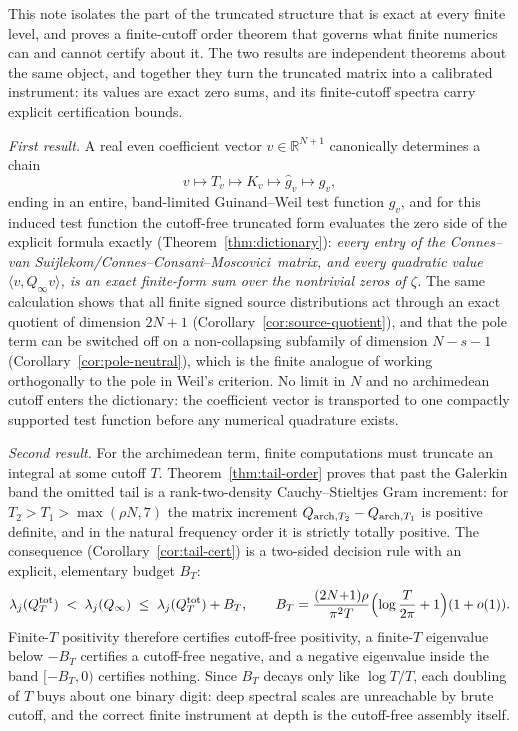 \documentclass[11pt]{article}
\theoremstyle{plain}
\theoremstyle{definition}
\theoremstyle{remark}
\newcommand{\R}{\mathbb R}
\newcommand{\cvs}{Connes--van Suijlekom}
\newcommand{\ccm}{Connes--Consani--Moscovici}
\newcommand{\wh}{\widehat}
\newcommand{\Qinf}{Q_{\infty}}
\begin{document}
This note isolates the part of the truncated structure that is exact at every
finite level, and proves a finite-cutoff order theorem that governs what
finite numerics can and cannot certify about it.  The two results are
independent theorems about the same object, and together they turn the
truncated matrix into a calibrated instrument: its values are exact zero
sums, and its finite-cutoff spectra carry explicit certification bounds.

\emph{First result.}  A real even coefficient vector $v\in\R^{N+1}$
canonically determines a chain
\[
        v\longmapsto T_v\longmapsto K_v\longmapsto \wh g_v\longmapsto g_v,
\]
ending in an entire, band-limited Guinand--Weil test function $g_v$, and for
this induced test function the cutoff-free truncated form evaluates the zero
side of the explicit formula exactly (Theorem~\ref{thm:dictionary}):
\emph{every entry of the \cvs/\ccm\ matrix, and every quadratic value
$\langle v,\Qinf v\rangle$, is an exact finite-form sum over the nontrivial
zeros of $\zeta$.}  The same calculation shows that all finite signed source
distributions act through an exact quotient of dimension $2N+1$
(Corollary~\ref{cor:source-quotient}), and that the pole term can be switched
off on a non-collapsing subfamily of dimension $N-s-1$
(Corollary~\ref{cor:pole-neutral}), which is the finite analogue of working
orthogonally to the pole in Weil's criterion.  No limit in $N$ and no
archimedean cutoff enters the dictionary: the coefficient vector is
transported to one compactly supported test function before any numerical
quadrature exists.

\emph{Second result.}  For the archimedean term, finite computations must
truncate an integral at some cutoff $T$.  Theorem~\ref{thm:tail-order} proves
that past the Galerkin band the omitted tail is a rank-two-density
Cauchy--Stieltjes Gram increment: for $T_2>T_1>\max(\rho N,7)$ the matrix
increment $Q_{{\rm arch},T_2}-Q_{{\rm arch},T_1}$ is positive definite, and in
the natural frequency order it is strictly totally positive.  The consequence
(Corollary~\ref{cor:tail-cert}) is a two-sided decision rule with an explicit,
elementary budget $B_T$:
\[
   \lambda_j(Q_T^{\rm tot})\;<\;\lambda_j(\Qinf)\;\le\;\lambda_j(Q_T^{\rm tot})+B_T,
   \qquad
   B_T=\frac{(2N{+}1)\rho}{\pi^2T}\Bigl(\log\frac{T}{2\pi}+1\Bigr)(1+o(1)).
\]
Finite-$T$ positivity therefore certifies cutoff-free positivity, a
finite-$T$ eigenvalue below $-B_T$ certifies a cutoff-free negative, and a
negative eigenvalue inside the band $[-B_T,0)$ certifies nothing.  Since
$B_T$ decays only like $\log T/T$, each doubling of $T$ buys about one binary
digit: deep spectral scales are unreachable by brute cutoff, and the correct
finite instrument at depth is the cutoff-free assembly itself.
\end{document}
